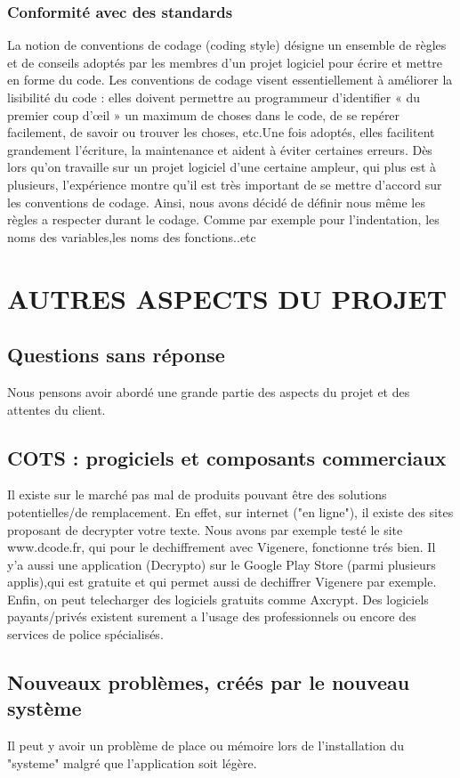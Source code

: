 \documentclass[a4]{article}
\begin{document}
			\subsubsection {Conformité avec des standards}
La notion de conventions de codage (coding style) désigne un ensemble de règles et de conseils 
adoptés par les membres d’un projet logiciel pour écrire et mettre en forme du code.
Les conventions de codage visent essentiellement à améliorer la lisibilité du code : elles doivent 
permettre au programmeur d’identifier « du premier coup d’œil » un maximum de choses dans 
le  code, de se repérer facilement, de savoir ou trouver les choses, etc.Une fois adoptés, elles
facilitent grandement l’écriture, la maintenance et aident à éviter certaines erreurs.
Dès lors qu’on travaille sur un projet logiciel d’une certaine ampleur, qui plus est à
plusieurs, l’expérience montre qu’il est très important de se mettre d’accord sur les
conventions de codage. Ainsi, nous avons décidé de définir nous même les règles a respecter durant le codage. Comme par exemple pour l'indentation, les noms des variables,les noms des fonctions..etc
\section{AUTRES ASPECTS DU PROJET}
		\subsection{Questions sans réponse}
		Nous pensons avoir abordé une grande partie des aspects du projet et des attentes du client.
		\subsection{COTS : progiciels et composants commerciaux}
		Il existe sur le marché pas mal de produits pouvant être des solutions potentielles/de remplacement. En effet, 			sur internet
		("en ligne"), il existe des sites proposant de decrypter votre texte. Nous avons par exemple testé le site 			www.dcode.fr, qui
		pour le dechiffrement avec Vigenere, fonctionne trés bien.
		Il y'a aussi une application (Decrypto) sur le Google Play Store (parmi plusieurs applis),qui est gratuite et 			qui permet aussi de dechiffrer Vigenere par exemple.
		Enfin, on peut telecharger des logiciels gratuits comme Axcrypt. Des logiciels payants/privés existent surement 			a l'usage des
		professionnels ou encore des services de police spécialisés.
		\subsection{Nouveaux problèmes, créés par le nouveau système}
		Il peut y avoir un problème de place ou mémoire lors de l'installation du "systeme" malgré que l'application 			soit légère.
		
\end{document}
